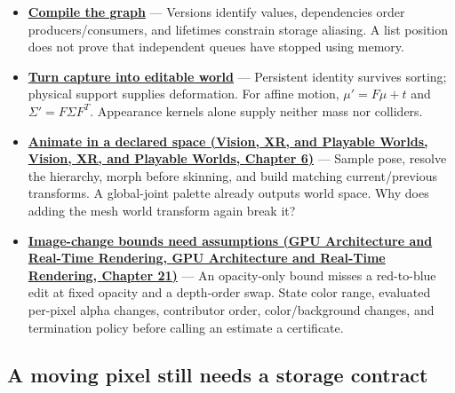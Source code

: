 \begin{itemize}
  \textbf{\hyperref[01-foundations-i-ch011-retire-a-resource-after-every-user-not-after-one-convenient-clock]{Retire across queues}} --- Every required queue counter must be reached. \((10,4,100)\) does not cover required \((9,5,3)\). Ownership preserves the payload; completion permits destruction.
\item
  \textbf{\hyperref[06-engine-ii-ch042-compile-a-render-graph-before-executing-it]{Compile the graph}} --- Versions identify values, dependencies order producers/consumers, and lifetimes constrain storage aliasing. A list position does not prove that independent queues have stopped using memory.
\item
  \textbf{\hyperref[06-engine-ii-ch042-rendering-identity-becomes-world-identity-only-through-an-explicit-bridge]{Turn capture into editable world}} --- Persistent identity survives sorting; physical support supplies deformation. For affine motion, \(\mu'=F\mu+t\) and \(\Sigma'=F\Sigma F^T\). Appearance kernels alone supply neither mass nor colliders.
\item
  \textbf{\href{../07-Vision-XR-and-Playable-Worlds/main.pdf\#nameddest=04-visual-computing-ii-ch037-build-a-pose-first-then-deform-the-surface}{Animate in a declared space (Vision, XR, and Playable Worlds, Vision, XR, and Playable Worlds, Chapter 6)}} --- Sample pose, resolve the hierarchy, morph before skinning, and build matching current/previous transforms. A global-joint palette already outputs world space. Why does adding the mesh world transform again break it?
\item
  \textbf{\href{../06-GPU-Architecture-and-Real-Time-Rendering/main.pdf\#nameddest=06-engine-ii-ch045-an-image-change-certificate-must-name-the-edits-it-covers}{Image-change bounds need assumptions (GPU Architecture and Real-Time Rendering, GPU Architecture and Real-Time Rendering, Chapter 21)}} --- An opacity-only bound misses a red-to-blue edit at fixed opacity and a depth-order swap. State color range, evaluated per-pixel alpha changes, contributor order, color/background changes, and termination policy before calling an estimate a certificate.
\end{itemize}

\subsection{A moving pixel still needs a storage contract}\label{appendix-a8f634b076b5-a-moving-pixel-still-needs-a-storage-contract}


